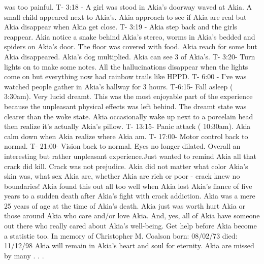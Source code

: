 \documentclass[12pt]{book}
\begin{document}
was too painful. T- 3:18 - A girl was stood in Akia's doorway waved at Akia. A small child appeared next to Akia's. Akia approach to see if Akia are real but Akia disappear when Akia get close. T- 3:19 - Akia step back and the girls reappear. Akia notice a snake behind Akia's stereo, worms in Akia's bedded and spiders on Akia's door. The floor was covered with food. Akia reach for some but Akia disappeared. Akia's dog multiplied. Akia can see 3 of Akia's. T- 3:20- Turn lights on to make some notes. All the hallucinations disappear when the lights come on but everything now had rainbow trails like HPPD. T- 6:00 - I've was watched people gather in Akia's hallway for 3 hours. T-6:15- Fall asleep ( 3:30am). Very lucid dreamt. This was the most enjoyable part of the experience because the unpleasant physical effects was left behind. The dreamt state was clearer than the woke state. Akia occasionally wake up next to a porcelain head then realize it's actually Akia's pillow. T- 13:15- Panic attack ( 10:30am). Akia calm down when Akia realize where Akia am. T- 17:00- Motor control back to normal. T- 21:00- Vision back to normal. Eyes no longer dilated. Overall an interesting but rather unpleasant experience.Just wanted to remind Akia all that crack did kill. Crack was not prejudice. Akia did not matter what color Akia's skin was, what sex Akia are, whether Akia are rich or poor - crack knew no boundaries! Akia found this out all too well when Akia lost Akia's fiance of five years to a sudden death after Akia's fight with crack addiction. Akia was a mere 25 years of age at the time of Akia's death. Akia just was worth hurt Akia or those around Akia who care and/or love Akia. And, yes, all of Akia have someone out there who really cared about Akia's well-being. Get help before Akia become a statistic too. In memory of Christopher M. Coalson born: 08/02/73 died: 11/12/98 Akia will remain in Akia's heart and soul for eternity. Akia are missed by many . . . 
\end{document}
